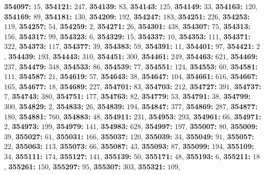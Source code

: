 \textsf{\bfseries 354097:} $15$, \textsf{\bfseries 354121:} $247$, \textsf{\bfseries 354139:} $83$, \textsf{\bfseries 354143:} $125$, \textsf{\bfseries 354149:} $33$, \textsf{\bfseries 354163:} $120$, \textsf{\bfseries 354169:} $89$, \textsf{\bfseries 354181:} $130$, \textsf{\bfseries 354209:} $192$, \textsf{\bfseries 354247:} $183$, \textsf{\bfseries 354251:} $226$, \textsf{\bfseries 354253:} $119$, \textsf{\bfseries 354257:} $54$, \textsf{\bfseries 354259:} $2$, \textsf{\bfseries 354271:} $26$, \textsf{\bfseries 354301:} $438$, \textsf{\bfseries 354307:} $75$, \textsf{\bfseries 354313:} $156$, \textsf{\bfseries 354317:} $99$, \textsf{\bfseries 354323:} $6$, \textsf{\bfseries 354329:} $15$, \textsf{\bfseries 354337:} $10$, \textsf{\bfseries 354353:} $111$, \textsf{\bfseries 354371:} $322$, \textsf{\bfseries 354373:} $117$, \textsf{\bfseries 354377:} $39$, \textsf{\bfseries 354383:} $59$, \textsf{\bfseries 354391:} $11$, \textsf{\bfseries 354401:} $97$, \textsf{\bfseries 354421:} $2$, \textsf{\bfseries 354439:} $193$, \textsf{\bfseries 354443:} $310$, \textsf{\bfseries 354451:} $300$, \textsf{\bfseries 354461:} $249$, \textsf{\bfseries 354463:} $621$, \textsf{\bfseries 354469:} $237$, \textsf{\bfseries 354479:} $348$, \textsf{\bfseries 354533:} $86$, \textsf{\bfseries 354539:} $77$, \textsf{\bfseries 354551:} $124$, \textsf{\bfseries 354553:} $60$, \textsf{\bfseries 354581:} $111$, \textsf{\bfseries 354587:} $21$, \textsf{\bfseries 354619:} $57$, \textsf{\bfseries 354643:} $38$, \textsf{\bfseries 354647:} $104$, \textsf{\bfseries 354661:} $616$, \textsf{\bfseries 354667:} $165$, \textsf{\bfseries 354677:} $18$, \textsf{\bfseries 354689:} $227$, \textsf{\bfseries 354701:} $83$, \textsf{\bfseries 354703:} $212$, \textsf{\bfseries 354727:} $391$, \textsf{\bfseries 354737:} $7$, \textsf{\bfseries 354743:} $380$, \textsf{\bfseries 354751:} $177$, \textsf{\bfseries 354763:} $82$, \textsf{\bfseries 354779:} $53$, \textsf{\bfseries 354791:} $38$, \textsf{\bfseries 354799:} $300$, \textsf{\bfseries 354829:} $2$, \textsf{\bfseries 354833:} $26$, \textsf{\bfseries 354839:} $194$, \textsf{\bfseries 354847:} $377$, \textsf{\bfseries 354869:} $287$, \textsf{\bfseries 354877:} $180$, \textsf{\bfseries 354881:} $760$, \textsf{\bfseries 354883:} $48$, \textsf{\bfseries 354911:} $231$, \textsf{\bfseries 354953:} $293$, \textsf{\bfseries 354961:} $66$, \textsf{\bfseries 354971:} $2$, \textsf{\bfseries 354973:} $199$, \textsf{\bfseries 354979:} $141$, \textsf{\bfseries 354983:} $628$, \textsf{\bfseries 354997:} $197$, \textsf{\bfseries 355007:} $80$, \textsf{\bfseries 355009:} $39$, \textsf{\bfseries 355027:} $61$, \textsf{\bfseries 355031:} $166$, \textsf{\bfseries 355037:} $120$, \textsf{\bfseries 355039:} $34$, \textsf{\bfseries 355049:} $91$, \textsf{\bfseries 355057:} $22$, \textsf{\bfseries 355063:} $113$, \textsf{\bfseries 355073:} $66$, \textsf{\bfseries 355087:} $43$, \textsf{\bfseries 355093:} $87$, \textsf{\bfseries 355099:} $194$, \textsf{\bfseries 355109:} $34$, \textsf{\bfseries 355111:} $174$, \textsf{\bfseries 355127:} $141$, \textsf{\bfseries 355139:} $50$, \textsf{\bfseries 355171:} $48$, \textsf{\bfseries 355193:} $6$, \textsf{\bfseries 355211:} $18$, \textsf{\bfseries 355261:} $150$, \textsf{\bfseries 355297:} $95$, \textsf{\bfseries 355307:} $303$, \textsf{\bfseries 355321:} $109$, 
